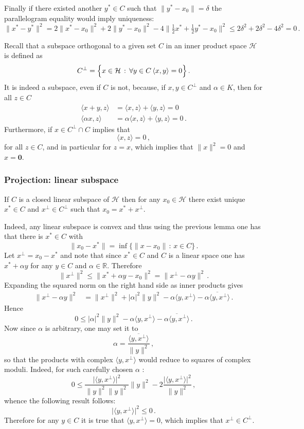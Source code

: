 \documentclass[a4paper]{article}
\newcommand{\Real}{\mathbb{R}}
\newcommand{\Hcal}{\mathcal{H}}
\begin{document}
Finally if there existed another $y^*\in C$ such that $\|y^*-x_0\| = \delta$
the parallelogram equality would imply uniqueness:
\[
\|x^*-y^*\|^2
= 2\|x^*-x_0\|^2 +2\|y^*-x_0\|^2
- 4\|\tfrac{1}{2}x^*+\tfrac{1}{2}y^* - x_0\|^2
\leq 2\delta^2 + 2\delta^2 - 4 \delta^2 = 0\,.
\]

Recall that a subspace orthogonal to a given set $C$ in an inner product space $\Hcal$ is
defined as
\[ C^\perp = \Bigl\{ x\in \Hcal\,:\, \forall y\in C\, \langle x,y\rangle = 0 \Bigr\} \,. \]
It is indeed a subspace, even if $C$ is not, because, if $x,y\in C^\perp$ and $\alpha\in K$,
then for all $z\in C$
\begin{align*}
	\langle x+y,z\rangle &= \langle x,z\rangle + \langle y,z\rangle = 0\\
	\langle \alpha x,z\rangle &= \alpha \langle x,z\rangle + \langle y,z\rangle = 0\,.
\end{align*}
Furthermore, if $x\in C^\perp \cap C$ implies that
\[ \langle x,z\rangle = 0 \,, \]
for all $z\in C$, and in particular for $z=x$, which implies that $\|x\|^2 = 0$
and $x = \mathbf{0}$.


\subsubsection{Projection: linear subspace} %
\label{ssub:projection_linear_subspace}

If $C$ is a closed linear subspace of $\Hcal$ then for any $x_0\in \Hcal$ there
exist unique $x^*\in C$ and $x^\perp\in C^\perp$ such that $x_0 = x^* + x^\perp$.

Indeed, any linear subspace is convex and thus using the previous lemma one has
that there is $x^*\in C$ with
\[ \| x_0-x^* \| = \inf\{\|x-x_0\|\,:\, x\in C\} \,. \]
Let $x^\perp = x_0 - x^*$ and note that since $x^*\in C$ and $C$ is a linear space
one has $x^*+\alpha y$ for any $y\in C$ and $\alpha\in \Real$. Therefore 
\[
\| x^\perp \|^2 \leq \| x^* + \alpha y - x_0 \|^2 = \| x^\perp - \alpha y \|^2\,.
\]
Expanding the squared norm on the right hand side as inner products gives \begin{align*}
	\| x^\perp - \alpha y \|^2
	&= \| x^\perp \|^2 + |\alpha|^2 \| y \|^2
	- \alpha \langle y, x^\perp \rangle
	- \overline{\alpha \langle y, x^\perp \rangle} \,.
\end{align*}
Hence
\[
0 \leq |\alpha|^2 \| y \|^2
	- \alpha \langle y, x^\perp \rangle
	- \overline{\alpha \langle y, x^\perp \rangle} \,.
\]
Now since $\alpha$ is arbitrary, one may set it to
\[ \alpha = \frac{\overline{\langle y, x^\perp \rangle}}{\|y\|^2}\,, \]
so that the products with complex $\langle y, x^\perp \rangle$ would reduce to squares
of complex moduli. Indeed, for such carefully chosen $\alpha$ :
\[
0 \leq \frac{\bigl\lvert \langle y, x^\perp \rangle \bigr\rvert^2 }{\|y\|^2 \|y\|^2} \| y \|^2
	- 2 \frac{\bigl\lvert \langle y, x^\perp \rangle \bigr\rvert^2 }{\|y\|^2}\,,
\]
whence the following result follows:
\[
\bigl\lvert \langle y, x^\perp \rangle \bigr\rvert^2 \leq 0 \,.
\]
Therefore for any $y\in C$ it is true that $\langle y, x^\perp \rangle = 0$, which
implies that $x^\perp \in C^\perp$.
\end{document}
